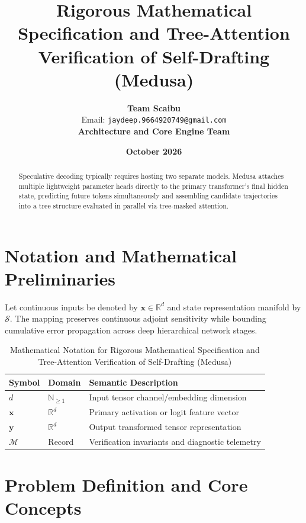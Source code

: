 \documentclass[11pt,a4paper]{article}
\title{\textbf{Rigorous Mathematical Specification and Tree-Attention Verification of Self-Drafting (Medusa)}}
\author{\textbf{Team Scaibu} \\ \small Email: \texttt{jaydeep.9664920749@gmail.com} \\ \small \textbf{Architecture and Core Engine Team}}
\date{\textbf{October 2026}}
\theoremstyle{definition}
\begin{document}
\maketitle

\begin{abstract}
Speculative decoding typically requires hosting two separate models. Medusa attaches multiple lightweight parameter heads directly to the primary transformer's final hidden state, predicting future tokens simultaneously and assembling candidate trajectories into a tree structure evaluated in parallel via tree-masked attention.
\end{abstract}

\section{Notation and Mathematical Preliminaries}

Let continuous inputs be denoted by $\mathbf{x} \in \mathbb{R}^d$ and state representation manifold by $\mathcal{S}$. The mapping preserves continuous adjoint sensitivity while bounding cumulative error propagation across deep hierarchical network stages.

\begin{table}[h]
\centering
\caption{Mathematical Notation for Rigorous Mathematical Specification and Tree-Attention Verification of Self-Drafting (Medusa)}
\begin{tabular}{lll}
\toprule
\textbf{Symbol} & \textbf{Domain} & \textbf{Semantic Description} \\
\midrule
$d$ & $\mathbb{N}_{\ge 1}$ & Input tensor channel/embedding dimension \\
$\mathbf{x}$ & $\mathbb{R}^d$ & Primary activation or logit feature vector \\
$\mathbf{y}$ & $\mathbb{R}^d$ & Output transformed tensor representation \\
$\mathcal{M}$ & Record & Verification invariants and diagnostic telemetry \\
\bottomrule
\end{tabular}
\end{table}

\section{Problem Definition and Core Concepts}
\end{document}

